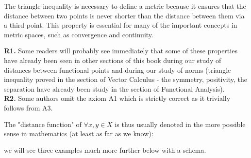 	The triangle inequality is necessary to define a metric because it ensures that the distance between two points is never shorter than the distance between them via a third point. This property is essential for many of the important concepts in metric spaces, such as convergence and continuity.
	\begin{tcolorbox}[title=Remarks,arc=10pt,breakable,drop lifted shadow,
  skin=enhanced,
  skin first is subskin of={enhancedfirst}{arc=10pt,no shadow},
  skin middle is subskin of={enhancedmiddle}{arc=10pt,no shadow},
  skin last is subskin of={enhancedlast}{drop lifted shadow}]
		\textbf{R1.} Some readers will probably see immediately that some of these properties have already been seen in other sections of this book during our study of distances between functional points and during our study of norms (triangle inequality proved in the section of Vector Calculus - the symmetry, positivity, the separation have already been study in the section of Functional Analysis).\\
		
		\textbf{R2.} Some authors omit the axiom A1 which is strictly correct as it trivially follows from A3.\\
	\end{tcolorbox}
	The "distance function" of $\forall x,y \in X$ is thus usually denoted in the more possible sense in mathematics (at least as far as we know):
	
	we will see three examples much more further below with a schema.
	
